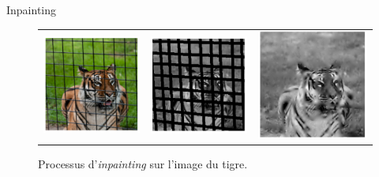 \begin{frame}{Inpainting}
\begin{figure}
\centering
\begin{tabular}{ccc}
\includegraphics[width = .3\columnwidth]{fig/tigre_initial.png} &
\includegraphics[width = .3\columnwidth]{fig/tigre_masque.png} &
\includegraphics[width = .3\columnwidth]{fig/tigre_inpainting.png} \\
\end{tabular}
\caption{Processus d'\emph{inpainting} sur l'image du tigre.}
\end{figure}
\end{frame}
